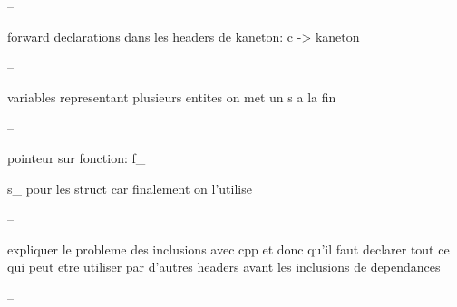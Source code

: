 --

forward declarations dans les headers de kaneton: c -> kaneton

--

variables representant plusieurs entites on met un s a la fin

--

pointeur sur fonction: f_

s_ pour les struct car finalement on l'utilise

--

expliquer le probleme des inclusions avec cpp et donc qu'il faut
declarer tout ce qui peut etre utiliser par d'autres headers avant
les inclusions de dependances

--